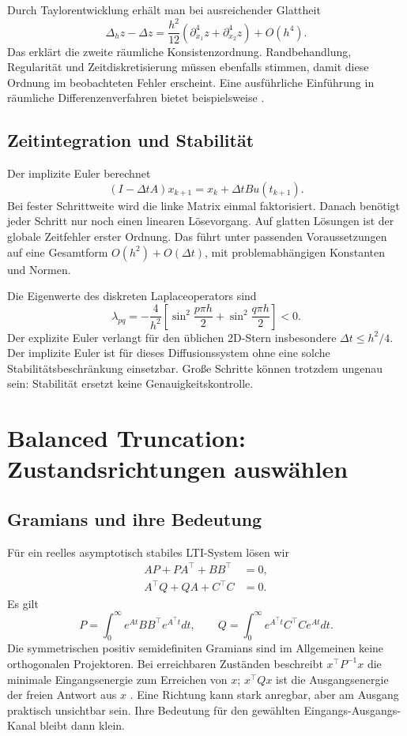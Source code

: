 Durch Taylorentwicklung erhält man bei ausreichender Glattheit
\begin{equation}
 \Delta_h z-\Delta z=\frac{h^2}{12}(\partial_{x_1}^4z+\partial_{x_2}^4z)+O(h^4).
\end{equation}
Das erklärt die zweite räumliche Konsistenzordnung. Randbehandlung, Regularität und Zeitdiskretisierung müssen ebenfalls stimmen, damit diese Ordnung im beobachteten Fehler erscheint. Eine ausführliche Einführung in räumliche Differenzenverfahren bietet beispielsweise \cite{kochmann}.

\subsection{Zeitintegration und Stabilität}
Der implizite Euler berechnet
\begin{equation}\label{eq:euler}
 (I-\Delta t A)x_{k+1}=x_k+\Delta t B u(t_{k+1}).
\end{equation}
Bei fester Schrittweite wird die linke Matrix einmal faktorisiert. Danach benötigt jeder Schritt nur noch einen linearen Lösevorgang. Auf glatten Lösungen ist der globale Zeitfehler erster Ordnung. Das führt unter passenden Voraussetzungen auf eine Gesamtform $O(h^2)+O(\Delta t)$, mit problemabhängigen Konstanten und Normen.

Die Eigenwerte des diskreten Laplaceoperators sind
\begin{equation}
 \lambda_{pq}=-\frac4{h^2}\left[\sin^2\!\frac{p\pi h}{2}+\sin^2\!\frac{q\pi h}{2}\right]<0.
\end{equation}
Der explizite Euler verlangt für den üblichen 2D-Stern insbesondere $\Delta t\le h^2/4$. Der implizite Euler ist für dieses Diffusionssystem ohne eine solche Stabilitätsbeschränkung einsetzbar. Große Schritte können trotzdem ungenau sein: Stabilität ersetzt keine Genauigkeitskontrolle.

\section{Balanced Truncation: Zustandsrichtungen auswählen}
\subsection{Gramians und ihre Bedeutung}
Für ein reelles asymptotisch stabiles LTI-System lösen wir
\begin{align}
 AP+PA^\top+BB^\top&=0,\\
 A^\top Q+QA+C^\top C&=0.
\end{align}
Es gilt
\begin{equation}
 P=\int_0^\infty e^{At}BB^\top e^{A^\top t}dt,\qquad
 Q=\int_0^\infty e^{A^\top t}C^\top Ce^{At}dt.
\end{equation}
Die symmetrischen positiv semidefiniten Gramians sind im Allgemeinen keine orthogonalen Projektoren. Bei erreichbaren Zuständen beschreibt $x^\top P^{-1}x$ die minimale Eingangsenergie zum Erreichen von $x$; $x^\top Qx$ ist die Ausgangsenergie der freien Antwort aus $x$ \cite{energy}. Eine Richtung kann stark anregbar, aber am Ausgang praktisch unsichtbar sein. Ihre Bedeutung für den gewählten Eingangs-Ausgangs-Kanal bleibt dann klein.

